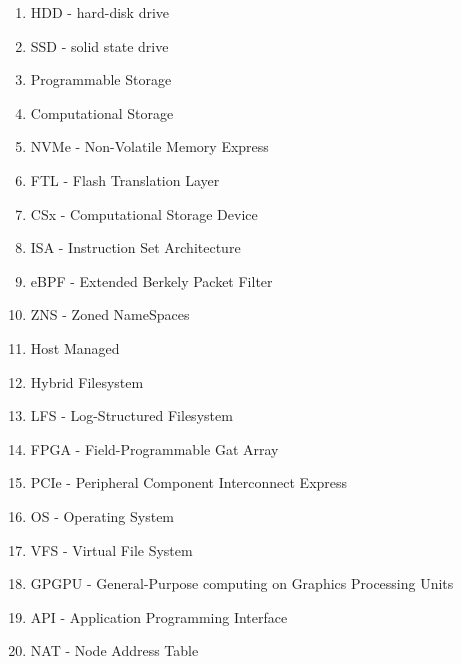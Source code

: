 \documentclass[conference]{IEEEtran}
\begin{document}
\begin{enumerate}
	\item HDD - hard-disk drive %
	\item SSD - solid state drive %
	\item Programmable Storage %
	\item Computational Storage %
	\item NVMe - Non-Volatile Memory Express %
	\item FTL - Flash Translation Layer %
	\item CSx - Computational Storage Device %
	\item ISA - Instruction Set Architecture %
	\item eBPF - Extended Berkely Packet Filter %
	\item ZNS - Zoned NameSpaces %
	\item Host Managed %
	\item Hybrid Filesystem %
	\item LFS - Log-Structured Filesystem %
	\item FPGA - Field-Programmable Gat Array %
	\item PCIe - Peripheral Component Interconnect Express %
	\item OS - Operating System %
	\item VFS - Virtual File System %
	\item GPGPU - General-Purpose computing on Graphics Processing Units %
	\item API - Application Programming Interface %
	\item NAT - Node Address Table %
\end{enumerate}



\end{document}
